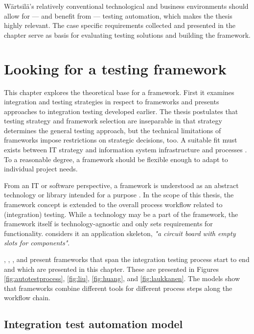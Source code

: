 \documentclass[12pt,a4paper,oneside,pdftex]{report}
\begin{document}
Wärtsilä's relatively conventional technological and business environments should allow for --- and benefit from --- testing automation, which makes the thesis highly relevant. The case specific requirements collected and presented in the chapter serve as basis for evaluating testing solutions and building the framework.

\chapter{Looking for a testing framework}
\label{chapter:frameworktheory}

This chapter explores the theoretical base for a framework. First it examines integration and testing strategies in respect to frameworks and presents approaches to integration testing developed earlier. The thesis postulates that testing strategy and framework selection are inseparable in that strategy determines the general testing approach, but the technical limitations of frameworks impose restrictions on strategic decisions, too. A suitable fit must exists between IT strategy and information system infrastructure and processes \citep{henderson1993strategic}. To a reasonable degree, a framework should be flexible enough to adapt to individual project needs.


From an IT or software perspective, a framework is understood as an abstract technology or library intended for a purpose \citep{johnson1988designing}. In the scope of this thesis, the framework concept is extended to the overall process workflow related to (integration) testing. While a technology may be a part of the framework, the framework itself is technology-agnostic and only sets requirements for functionality. \citet{pezze2008software} considers it an application skeleton, \textit{"a circuit board with empty slots for components"}. 

\citet{fewster1999software}, \citet{liu2009unified}, \citet{huang2008surrogate}, and \citet{laukkanen2006data} present frameworks that span the integration testing process start to end and which are presented in this chapter. These are presented in Figures \ref{fig:autotestprocess}, \ref{fig:liu}, \ref{fig:huang}, and \ref{fig:laukkanen}. The models show that frameworks combine different tools for different process steps along the workflow chain.

\section{Integration test automation model}
\end{document}
